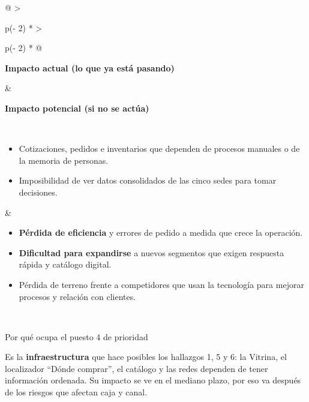 \documentclass[11pt,a4paper]{article}
\begin{document}
\begin{longtable}[]{@{}
  >{\raggedright\arraybackslash}p{(\columnwidth - 2\tabcolsep) * }
  >{\raggedright\arraybackslash}p{(\columnwidth - 2\tabcolsep) * }@{}}
\toprule\noalign{}
\begin{minipage}[b]{\linewidth}\raggedright
\textbf{Impacto actual (lo que ya está pasando)}
\end{minipage} & \begin{minipage}[b]{\linewidth}\raggedright
\textbf{Impacto potencial (si no se actúa)}
\end{minipage} \\
\midrule\noalign{}
\endfirsthead
\bottomrule\noalign{}
\endlastfoot
\begin{minipage}[t]{\linewidth}\raggedright
\begin{itemize}
\item
  Cotizaciones, pedidos e inventarios que dependen de procesos manuales o de la memoria de personas.
\item
  Imposibilidad de ver datos consolidados de las cinco sedes para tomar decisiones.
\end{itemize}
\end{minipage} & \begin{minipage}[t]{\linewidth}\raggedright
\begin{itemize}
\item
  \textbf{Pérdida de eficiencia} y errores de pedido a medida que crece la operación.
\item
  \textbf{Dificultad para expandirse} a nuevos segmentos que exigen respuesta rápida y catálogo
  digital.
\item
  Pérdida de terreno frente a competidores que usan la tecnología para mejorar procesos y relación
  con clientes.
\end{itemize}
\end{minipage} \\
\end{longtable}

\begin{cajaaviso}{Por qué ocupa el puesto 4 de prioridad}

Es la \textbf{infraestructura} que hace posibles los hallazgos 1, 5 y 6: la Vitrina, el localizador
``Dónde comprar'', el catálogo y las redes dependen de tener información ordenada. Su impacto se ve
en el mediano plazo, por eso va después de los riesgos que afectan caja y canal.

\end{cajaaviso}
\end{document}
